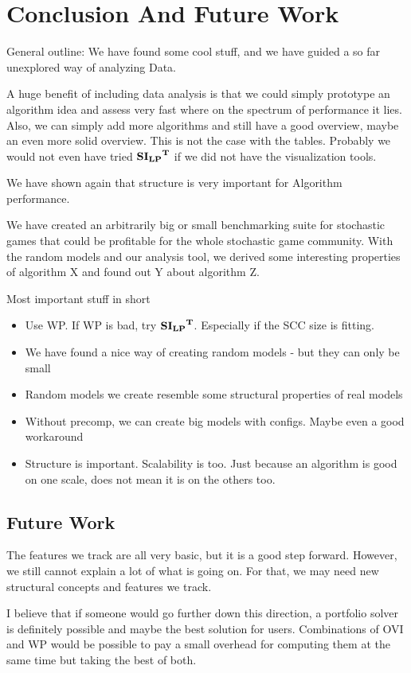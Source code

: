 \chapter{Conclusion And Future Work} \label{ch:conclusion}
General outline: We have found some cool stuff, and we have guided a so far unexplored way of analyzing Data.

A huge benefit of including data analysis is that we could simply prototype an algorithm idea and assess very fast where on the spectrum of performance it lies.
Also, we can simply add more algorithms and still have a good overview, maybe an even more solid overview. This is not the case with the tables.
Probably we would not even have tried $\mathbf{\mathbf{SI_{LP}}^T}$ if we did not have the visualization tools.

We have shown again that structure is very important for Algorithm performance.

We have created an arbitrarily big or small benchmarking suite for stochastic games that could be profitable for the whole stochastic game community.
With the random models and our analysis tool, we derived some interesting properties of algorithm X and found out Y about algorithm Z.


Most important stuff in short
\begin{itemize}
    \item Use WP. If WP is bad, try $\mathbf{\mathbf{SI_{LP}}^T}$. Especially if the SCC size is fitting.
    \item We have found a nice way of creating random models - but they can only be small
    \item Random models we create resemble some structural properties of real models
    \item Without precomp, we can create big models with configs. Maybe even a good workaround
    \item Structure is important. Scalability is too. Just because an algorithm is good on one scale, does not mean it is on the others too.
\end{itemize}

\section{Future Work}
The features we track are all very basic, but it is a good step forward. However, we still cannot explain a lot of what is going on.
For that, we may need new structural concepts and features we track.

I believe that if someone would go further down this direction, a portfolio solver is definitely possible and maybe the best solution for users.
Combinations of OVI and WP would be possible to pay a small overhead for computing them at the same time but taking the best of both.

